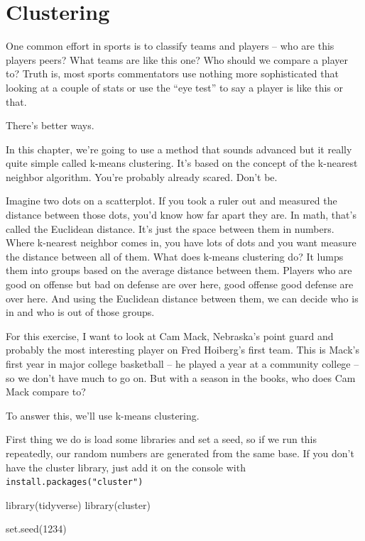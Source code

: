 \documentclass[
]{book}
\newenvironment{Shaded}{\begin{snugshade}}{\end{snugshade}}
\newcommand{\DecValTok}[1]{\textcolor[rgb]{0.00,0.00,0.81}{#1}}
\newcommand{\FunctionTok}[1]{\textcolor[rgb]{0.00,0.00,0.00}{#1}}
\newcommand{\NormalTok}[1]{#1}
\begin{document}
\hypertarget{clustering}{%
\chapter{Clustering}\label{clustering}}

One common effort in sports is to classify teams and players -- who are this players peers? What teams are like this one? Who should we compare a player to? Truth is, most sports commentators use nothing more sophisticated that looking at a couple of stats or use the ``eye test'' to say a player is like this or that.

There's better ways.

In this chapter, we're going to use a method that sounds advanced but it really quite simple called k-means clustering. It's based on the concept of the k-nearest neighbor algorithm. You're probably already scared. Don't be.

Imagine two dots on a scatterplot. If you took a ruler out and measured the distance between those dots, you'd know how far apart they are. In math, that's called the Euclidean distance. It's just the space between them in numbers. Where k-nearest neighbor comes in, you have lots of dots and you want measure the distance between all of them. What does k-means clustering do? It lumps them into groups based on the average distance between them. Players who are good on offense but bad on defense are over here, good offense good defense are over here. And using the Euclidean distance between them, we can decide who is in and who is out of those groups.

For this exercise, I want to look at Cam Mack, Nebraska's point guard and probably the most interesting player on Fred Hoiberg's first team. This is Mack's first year in major college basketball -- he played a year at a community college -- so we don't have much to go on. But with a season in the books, who does Cam Mack compare to?

To answer this, we'll use k-means clustering.

First thing we do is load some libraries and set a seed, so if we run this repeatedly, our random numbers are generated from the same base. If you don't have the cluster library, just add it on the console with \texttt{install.packages("cluster")}

\begin{Shaded}
\begin{Highlighting}[]
\FunctionTok{library}\NormalTok{(tidyverse)}
\FunctionTok{library}\NormalTok{(cluster)}

\FunctionTok{set.seed}\NormalTok{(}\DecValTok{1234}\NormalTok{)}
\end{Highlighting}
\end{Shaded}
\end{document}
